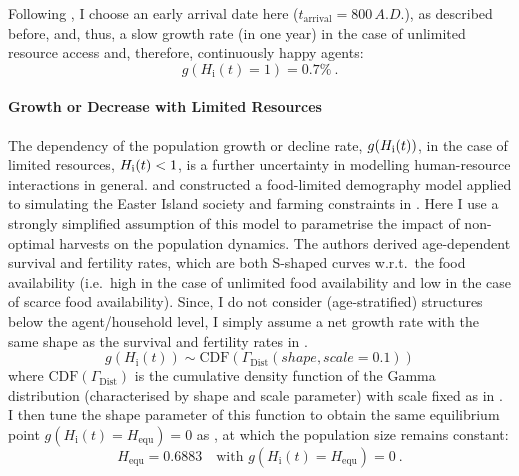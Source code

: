 Following \citet{Bahn2017}, I choose an early arrival date here ($t_\text{arrival}=800\, A.D.$), as described before, and, thus, a slow growth rate (in one year) in the case of unlimited resource access and, therefore, continuously happy agents: 
\begin{equation}
	g(H_\text{i}(t)=1) = 0.7\% \ .
\end{equation}

\paragraph{Growth or Decrease with Limited Resources}
The dependency of the population growth or decline rate, $g(H_{\rm i}(t))$, in the case of limited resources, $H_{\rm i}(t)<1$, is a further uncertainty in modelling human-resource interactions in general.
\citet{Lee2008} and \citet{Puleston2008} constructed a food-limited demography model applied to simulating the Easter Island society and farming constraints in \citet{Puleston2017}. 
Here I use a strongly simplified assumption of this model to parametrise the impact of non-optimal harvests on the population dynamics. 
The authors derived age-dependent survival and fertility rates, which are both S-shaped curves w.r.t.\ the food availability (i.e.\ high in the case of unlimited food availability and low in the case of scarce food availability).
Since, I do not consider (age-stratified) structures below the agent/household level, I simply assume a net growth rate with the same shape as the survival and fertility rates in \citet{Lee2008}.
\begin{equation}
g(H_\text{i}(t)) \sim \text{CDF}(\Gamma_\text{Dist}(shape, scale=0.1))
\end{equation}
where $\text{CDF}(\Gamma_\text{Dist})$ is the cumulative density function of the Gamma distribution (characterised by shape and scale parameter) with scale fixed as in \citet{Lee2008}.
I then tune the shape parameter of this function to obtain the same   equilibrium point $g(H_\text{i}(t) =H_\text{equ})=0$ as \citet{Puleston2017}, at which the population size remains constant:
\begin{equation}
H_\text{equ}=0.6883 \quad \text{with } g(H_\text{i}(t) = H_\text{equ})=0   \ .
\end{equation} 
